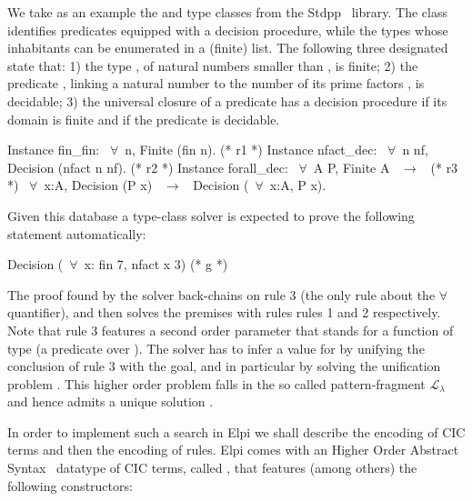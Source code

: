 \documentclass[sigconf,natbib=false,review]{acmart}
\newcommand{\llambda}{\ensuremath{\mathcal{L}_\lambda}\xspace}
\begin{document}
We take as an example the  and  type classes
from the Stdpp~\cite{JUNG_KREBBERS_JOURDAN_BIZJAK_BIRKEDAL_DREYER_2018}
library. The class  
identifies predicates equipped with a decision procedure, while
 the types whose inhabitants can be enumerated in a (finite) list.
The following three designated  state that:
1) the type , of natural numbers
smaller than , is finite;
2) the predicate , linking a natural number
 to the number of its prime factors , is decidable;
3) the universal closure of a predicate has a decision procedure if
its domain is finite and if the predicate is decidable.

\begin{coqcode}
Instance fin_fin: ~$\forall$~n, Finite (fin n).             (* r1 *)
Instance nfact_dec: ~$\forall$~n nf, Decision (nfact n nf). (* r2 *)
Instance forall_dec: ~$\forall$~A P, Finite A ~$\to$~            (* r3 *)
  ~$\forall$~x:A, Decision (P x) ~$\to$~ Decision (~$\forall$~x:A, P x).
\end{coqcode}

\noindent Given this database a type-class solver is expected to
prove the following statement automatically:

\begin{coqcode}
  Decision (~$\forall$~x: fin 7, nfact x 3)                   (* g *)
\end{coqcode}

\noindent
The proof found by the solver back-chains on rule 3 (the only rule
about the $\forall$ quantifier), and then solves the premises with rules
rules 1 and 2 respectively.
Note that rule 3 features a second order parameter  that stands for
a function of type  (a predicate over ).
The solver has to infer a value for  by unifying the conclusion
of rule 3 with the goal, and in particular by solving the unification
problem . This higher order problem falls in the so
called pattern-fragment \llambda~\cite{miller92jsc} and hence admits a unique
solution .

In order to implement such a search in Elpi we shall describe the encoding
of CIC terms and then the encoding of rules. Elpi comes with
an Higher Order Abstract Syntax~\cite{10.1145/53990.54010} datatype of CIC
terms, called , that features (among others) the following
constructors:
\end{document}
